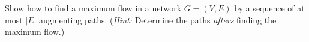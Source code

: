 Show how to find a maximum flow in a network $G=(V,E)$ by a sequence
of at most $|E|$ augmenting paths. (\textit{Hint:} Determine the paths
\textit{afters} finding the maximum flow.)

